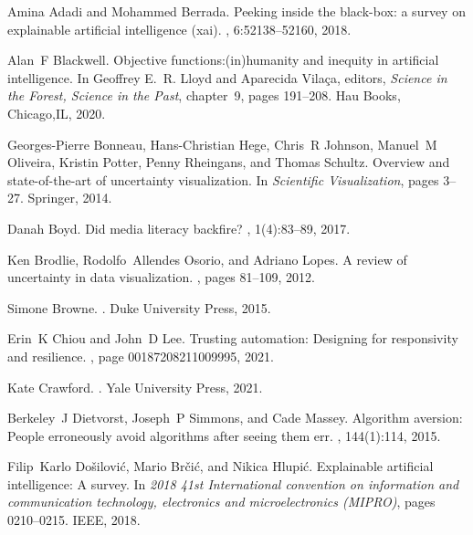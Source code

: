 \documentclass{article}
\begin{document}

%
\begin{thebibliography}{10}

Amina Adadi and Mohammed Berrada.
\newblock Peeking inside the black-box: a survey on explainable artificial
  intelligence (xai).
, 6:52138--52160, 2018.

Alan~F Blackwell.
\newblock Objective functions:(in)humanity and inequity in artificial
  intelligence.
\newblock In Geoffrey E.~R. Lloyd and Aparecida Vilaça, editors, {\em Science
  in the Forest, Science in the Past}, chapter~9, pages 191--208. Hau Books,
  Chicago,IL, 2020.

Georges-Pierre Bonneau, Hans-Christian Hege, Chris~R Johnson, Manuel~M
  Oliveira, Kristin Potter, Penny Rheingans, and Thomas Schultz.
\newblock Overview and state-of-the-art of uncertainty visualization.
\newblock In {\em Scientific Visualization}, pages 3--27. Springer, 2014.

Danah Boyd.
\newblock Did media literacy backfire?
, 1(4):83--89, 2017.

Ken Brodlie, Rodolfo~Allendes Osorio, and Adriano Lopes.
\newblock A review of uncertainty in data visualization.
,
  pages 81--109, 2012.

Simone Browne.
.
\newblock Duke University Press, 2015.

Erin~K Chiou and John~D Lee.
\newblock Trusting automation: Designing for responsivity and resilience.
, page 00187208211009995, 2021.

Kate Crawford.
.
\newblock Yale University Press, 2021.

Berkeley~J Dietvorst, Joseph~P Simmons, and Cade Massey.
\newblock Algorithm aversion: People erroneously avoid algorithms after seeing
  them err.
, 144(1):114, 2015.

Filip~Karlo Do{\v{s}}ilovi{\'c}, Mario Br{\v{c}}i{\'c}, and Nikica Hlupi{\'c}.
\newblock Explainable artificial intelligence: A survey.
\newblock In {\em 2018 41st International convention on information and
  communication technology, electronics and microelectronics (MIPRO)}, pages
  0210--0215. IEEE, 2018.


\end{thebibliography}
\end{document}
